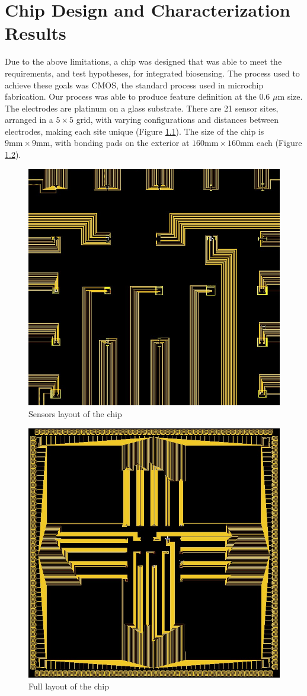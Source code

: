 \chapter{Chip Design and Characterization Results}

Due to the above limitations, a chip was designed that was able to meet the requirements, and test hypotheses, for integrated biosensing. The process used to achieve these goals was CMOS, the standard process used in microchip fabrication. Our process was able to produce feature definition at the 0.6 $\mu \mathrm{m}$ size. The electrodes are platinum on a glass substrate. There are 21 sensor sites, arranged in a $5 \times 5$ grid, with varying configurations and distances between electrodes, making each site unique (Figure \ref{biosensorchip-sensors}). The size of the chip is $9 \mathrm{mm} \times 9 \mathrm{mm}$, with bonding pads on the exterior at $160 \mathrm{mm} \times 160 \mathrm{mm}$ each (Figure \ref{biosensorchip}).

\begin{figure}
	\centering
	\includegraphics[width=0.5\linewidth]{figures/biosensorchip-sensors.png}
	\caption{Sensors layout of the chip}
	\label{biosensorchip-sensors}
\end{figure}

\begin{figure}
	\centering
	\includegraphics[width=0.5\linewidth]{figures/biosensorchip.png}
	\caption{Full layout of the chip}
	\label{biosensorchip}
\end{figure}

